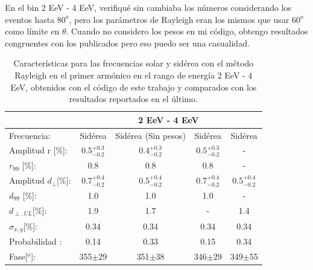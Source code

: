 En el bin 2 EeV - 4 EeV, verifiqué sin cambiaba los números considerando los eventos hasta $80^o$, pero los parámetros de Rayleigh eran los mismos que usar $60^o$  como límite en $\theta$.  Cuando no considero los pesos en mi código, obtengo resultados congruentes con los publicados pero eso puedo ser una casualidad.

\begin{table}[H]
    \begin{small}
        \begin{center}
            \begin{tabular}[c]{l|c|c|c|c|}
                                            & \multicolumn{4}{|c|}{2 EeV - 4 EeV}                                                               \\ \hline
                Frecuencia:                 & Sidérea              & Sidérea (Sin pesos)  & Sidérea \cite{codigo}    & Sidérea \cite{Aab_2020}   \\ \hline
                Amplitud r [\%]:            & $0.5^{+0.3}_{-0.2}$ & $0.4^{+0.3}_{-0.2}$ & $0.5^{+0.3}_{-0.2}$     & -                          \\
                $r_{99}$ [\%]:              & 0.8                 & 0.8                 & 0.8                     & -                          \\\hline
                Amplitud $d_\perp$[\%]:     & $0.7^{+0.4}_{-0.2}$ & $0.5^{+0.4}_{-0.2}$ & $0.7^{+0.4}_{-0.2}$ 	  & $0.5^{+0.4}_{-0.2}$                    \\
                $d_{99}$ [\%]:              & 1.0                 & 1.0                 & 1.0                     & -                         \\
                $d_{\perp,UL}$[\%]:         & 1.9                 & 1.7                 & -                       & 1.4                               \\\hline
                $\sigma_{x,y}$[\%]:         & 0.34	              & 0.34	            & 0.34	                  & 0.34                           \\
                Probabilidad      :         & 0.14                & 0.33                & 0.15               	  & 0.34                       \\
                Fase[$^o$]:                 & 355$\pm$29          & 351$\pm$38          & 346$\pm$29              & 349$\pm$55                    \\\hline
            \end{tabular}
        \end{center}
    \end{small}
    \caption{Características para las frecuencias solar y sidérea con el método Rayleigh en el primer armónico en el rango de energía 2 EeV - 4 EeV, obtenidos con el código de este trabajo \cite{Aab_2020} y comparados con los resultados reportados en el último.}
\end{table}


